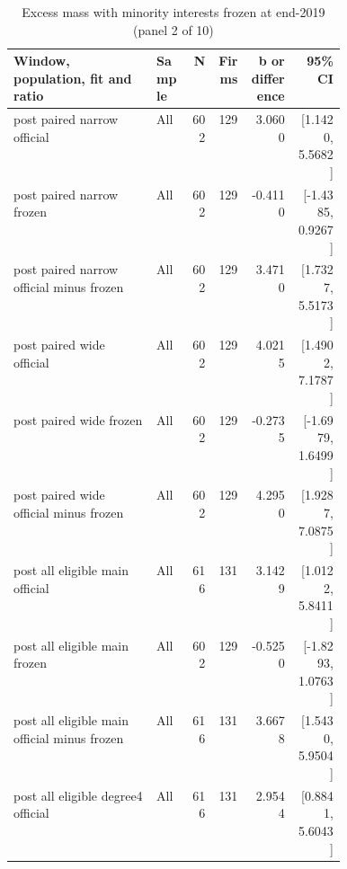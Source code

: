 \begin{table}[!htbp]\centering\scriptsize
\caption{Excess mass with minority interests frozen at end-2019 (panel 2 of 10)}
\begin{threeparttable}
\begin{tabular}{p{0.43\linewidth}lrrrr}
\toprule
Window, population, fit and ratio & Sample & N & Firms & b or difference & 95\% CI \\
\midrule
post paired narrow official & All & 602 & 129 & 3.0600 & [1.1420, 5.5682] \\
post paired narrow frozen & All & 602 & 129 & -0.4110 & [-1.4385, 0.9267] \\
post paired narrow official minus frozen & All & 602 & 129 & 3.4710 & [1.7327, 5.5173] \\
post paired wide official & All & 602 & 129 & 4.0215 & [1.4902, 7.1787] \\
post paired wide frozen & All & 602 & 129 & -0.2735 & [-1.6979, 1.6499] \\
post paired wide official minus frozen & All & 602 & 129 & 4.2950 & [1.9287, 7.0875] \\
post all eligible main official & All & 616 & 131 & 3.1429 & [1.0122, 5.8411] \\
post all eligible main frozen & All & 602 & 129 & -0.5250 & [-1.8293, 1.0763] \\
post all eligible main official minus frozen & All & 616 & 131 & 3.6678 & [1.5430, 5.9504] \\
post all eligible degree4 official & All & 616 & 131 & 2.9544 & [0.8841, 5.6043] \\
\bottomrule
\end{tabular}
\begin{tablenotes}[flushleft]\footnotesize

\end{tablenotes}
\end{threeparttable}
\end{table}
